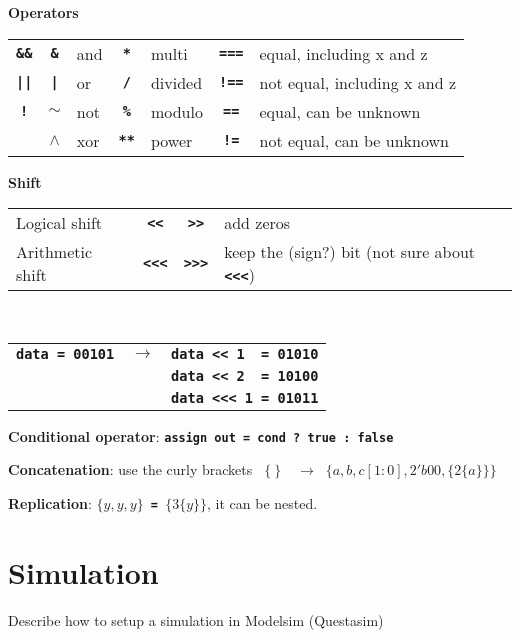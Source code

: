 \documentclass[a4paper,10pt,twoside]{article}
\newcommand{\0}{\textbf{0}}
\newcommand{\1}{\textbf{1}}
\newcommand{\code}[1]{{\color{Mulberry}\textbf{\texttt{#1}}}}
\begin{document}
    \begin{center}
        \textbf{Operators}\\[10pt]
        \begin{tabular}{ccl|cl|cl}
            \code{\&\&}   & \code{\&}       & and  & \code{*}   & multi    & \code{===}  & equal, including x and z \\
            \code{||}     & \code{|}        & or   & \code{/}   & divided  & \code{!==}  & not equal, including x and z  \\
            \code{!}      & \code{$\sim$}   & not  & \code{\%}  & modulo   & \code{==}   & equal, can be unknown \\
                          & \code{$\wedge$} & xor  & \code{**}  & power    & \code{!=}   & not equal, can be unknown  
        \end{tabular}
    \end{center}
    \begin{center}
        \textbf{Shift}\\[10pt]
        \begin{tabular}{lccl}
             Logical shift      & \code{<<}   &  \code{>>}   &  add zeros \\
             Arithmetic shift   & \code{<<<}  &  \code{>>>}  &  keep the (sign?) bit (not sure about \code{<<<})
        \end{tabular}\\[10pt]
        \begin{tabular}{lcl}
            \code{data = 00101} & $\rightarrow$ & \code{data << 1 \ = 01010} \\
                                &               & \code{data << 2 \ = 10100} \\
                                &               & \code{data <<< 1 = 01011}  \\
       \end{tabular}
    \end{center}
    
    \textbf{Conditional operator}: \code{assign out = cond ? true : false}

    \textbf{Concatenation}: use the curly brackets 
    \code{ $\{ ~ \}$ } 
    $\ \rightarrow\ $ 
    \code{$\{a, b, c\left[1:0\right], 2'b00, \{2\{a\}\}\}$}

    \textbf{Replication}: \code{$\{y,y,y\}$ = $\{3\{y\}\}$}, it can be nested.

\section{Simulation}
    Describe how to setup a simulation in Modelsim (Questasim)
\end{document}

